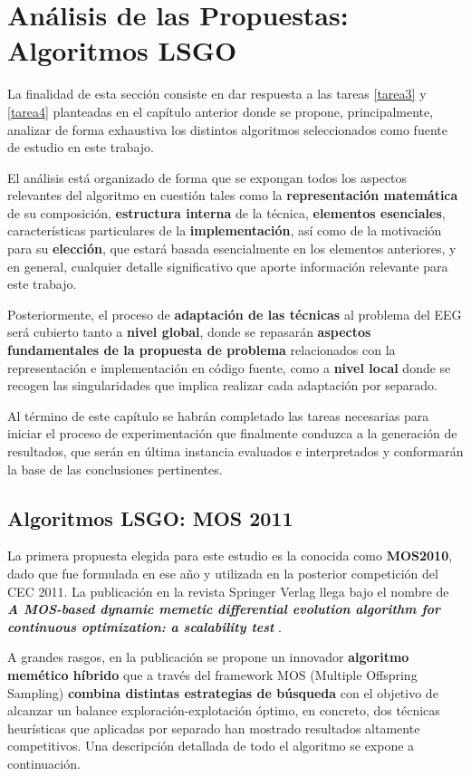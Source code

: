 \chapter{Análisis de las Propuestas: Algoritmos LSGO}

La finalidad de esta sección consiste en dar respuesta a las tareas \ref{tarea3} y \ref{tarea4} planteadas en el capítulo anterior donde se propone, principalmente, analizar de forma exhaustiva los distintos algoritmos seleccionados como fuente de estudio en este trabajo. 

El análisis está organizado de forma que se expongan todos los aspectos relevantes del algoritmo en cuestión tales como la \textbf{representación matemática} de su composición, \textbf{estructura interna} de la técnica, \textbf{elementos esenciales}, características particulares de la \textbf{implementación}, así como de la motivación para su \textbf{elección}, que estará basada esencialmente en los elementos anteriores, y en general, cualquier detalle significativo que aporte información relevante para este trabajo.

Posteriormente, el proceso de \textbf{adaptación de las técnicas} al problema del EEG será cubierto tanto a \textbf{nivel global}, donde se repasarán \textbf{aspectos fundamentales de la propuesta de problema} relacionados con la representación e implementación en código fuente, como a \textbf{nivel local} donde se recogen las singularidades que implica realizar cada adaptación por separado.

Al término de este capítulo se habrán completado las tareas necesarias para iniciar el proceso de experimentación que finalmente conduzca a la generación de resultados, que serán en última instancia evaluados e interpretados y conformarán la base de las conclusiones pertinentes.

\section{Algoritmos LSGO: MOS 2011}

La primera propuesta elegida para este estudio es la conocida como \textbf{MOS2010}, dado que fue formulada en ese año y utilizada en la posterior competición del CEC 2011\cite{ComprehensiveComparison}. La publicación en la revista Springer Verlag llega bajo el nombre de \textbf{\textit{A MOS-based dynamic memetic differential evolution algorithm for continuous optimization: a scalability test}} \cite{MOS2010}.

A grandes rasgos, en la publicación se propone un innovador \textbf{algoritmo memético híbrido} que a través del framework MOS (Multiple Offspring Sampling) \textbf{combina distintas estrategias de búsqueda} con el objetivo de alcanzar un balance exploración-explotación óptimo, en concreto, dos técnicas heurísticas que aplicadas por separado han mostrado resultados altamente competitivos. Una descripción detallada de todo el algoritmo se expone a continuación.

